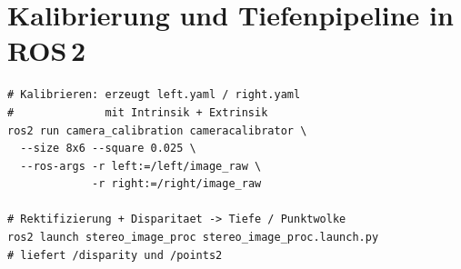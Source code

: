 \section{Kalibrierung und Tiefenpipeline in ROS\,2}

\begin{lstlisting}[style=bash,caption={Stereokalibrierung (Schachbrett) und Tiefenpipeline}]
# Kalibrieren: erzeugt left.yaml / right.yaml
#              mit Intrinsik + Extrinsik
ros2 run camera_calibration cameracalibrator \
  --size 8x6 --square 0.025 \
  --ros-args -r left:=/left/image_raw \
             -r right:=/right/image_raw

# Rektifizierung + Disparitaet -> Tiefe / Punktwolke
ros2 launch stereo_image_proc stereo_image_proc.launch.py
# liefert /disparity und /points2
\end{lstlisting}
